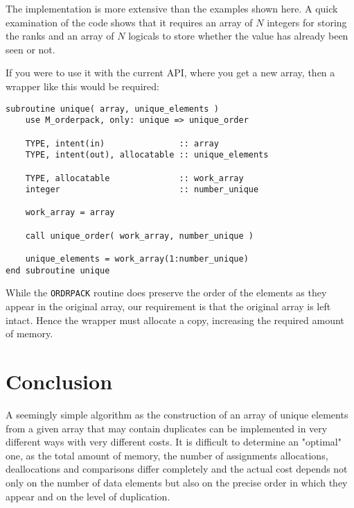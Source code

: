 \documentclass[onecolumn]{article}
\begin{document}
The implementation is more extensive than the examples shown here. A quick examination of the
code shows that it requires an array of $N$ integers for storing the ranks and an array of $N$ logicals
to store whether the value has already been seen or not.

If you were to use it with the current API, where you get a new array, then a wrapper like
this would be required:
%
\begin{verbatim}
subroutine unique( array, unique_elements )
    use M_orderpack, only: unique => unique_order

    TYPE, intent(in)               :: array
    TYPE, intent(out), allocatable :: unique_elements

    TYPE, allocatable              :: work_array
    integer                        :: number_unique

    work_array = array

    call unique_order( work_array, number_unique )

    unique_elements = work_array(1:number_unique)
end subroutine unique
\end{verbatim}

While the \verb+ORDRPACK+ routine does preserve the order of the elements as they appear
in the original array, our requirement is that the original array is left intact. Hence
the wrapper must allocate a copy, increasing the required amount of memory.

\section*{Conclusion}
A seemingly simple algorithm as the construction of an array of unique elements from a given array
that may contain duplicates can be implemented in very different ways with very different costs. It is
difficult to determine an "optimal" one, as the total amount of memory, the number of assignments
allocations, deallocations and comparisons differ completely and the actual cost depends not only
on the number of data elements but also on the precise order in which they appear and on the
level of duplication.
\end{document}
